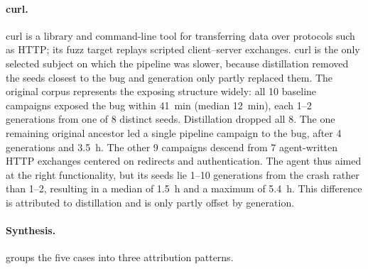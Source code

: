 \paragraph{curl.}
curl is a library and command-line tool for transferring data over protocols such as HTTP; its fuzz target replays scripted client--server exchanges.
curl is the only selected subject on which the pipeline was slower, because distillation removed the seeds closest to the bug and generation only partly replaced them.
The original corpus represents the exposing structure widely: all \num{10} baseline campaigns exposed the bug within \SI{41}{\minute} (median \SI{12}{\minute}), each \numrange{1}{2} generations from one of \num{8} distinct seeds.
Distillation dropped all \num{8}.
The one remaining original ancestor led a single pipeline campaign to the bug, after \num{4} generations and \SI{3.5}{\hour}.
The other \num{9} campaigns descend from \num{7} agent-written HTTP exchanges centered on redirects and authentication.
The agent thus aimed at the right functionality, but its seeds lie \numrange{1}{10} generations from the crash rather than \numrange{1}{2}, resulting in a median of \SI{1.5}{\hour} and a maximum of \SI{5.4}{\hour}.
This difference is attributed to distillation and is only partly offset by generation.


\paragraph{Synthesis.}
 groups the five cases into three attribution patterns.

